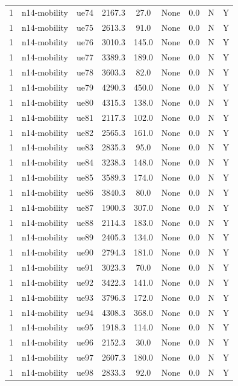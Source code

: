 \begin{table}[ht]
\begin{tabular}{|c|c|c|c|c|c|c|c|c|}
1 & n14-mobility & ue74 & 2167.3 & 27.0 & None & 0.0 & N & Y \\
1 & n14-mobility & ue75 & 2613.3 & 91.0 & None & 0.0 & N & Y \\
1 & n14-mobility & ue76 & 3010.3 & 145.0 & None & 0.0 & N & Y \\
1 & n14-mobility & ue77 & 3389.3 & 189.0 & None & 0.0 & N & Y \\
1 & n14-mobility & ue78 & 3603.3 & 82.0 & None & 0.0 & N & Y \\
1 & n14-mobility & ue79 & 4290.3 & 450.0 & None & 0.0 & N & Y \\
1 & n14-mobility & ue80 & 4315.3 & 138.0 & None & 0.0 & N & Y \\
1 & n14-mobility & ue81 & 2117.3 & 102.0 & None & 0.0 & N & Y \\
1 & n14-mobility & ue82 & 2565.3 & 161.0 & None & 0.0 & N & Y \\
1 & n14-mobility & ue83 & 2835.3 & 95.0 & None & 0.0 & N & Y \\
1 & n14-mobility & ue84 & 3238.3 & 148.0 & None & 0.0 & N & Y \\
1 & n14-mobility & ue85 & 3589.3 & 174.0 & None & 0.0 & N & Y \\
1 & n14-mobility & ue86 & 3840.3 & 80.0 & None & 0.0 & N & Y \\
1 & n14-mobility & ue87 & 1900.3 & 307.0 & None & 0.0 & N & Y \\
1 & n14-mobility & ue88 & 2114.3 & 183.0 & None & 0.0 & N & Y \\
1 & n14-mobility & ue89 & 2405.3 & 134.0 & None & 0.0 & N & Y \\
1 & n14-mobility & ue90 & 2794.3 & 181.0 & None & 0.0 & N & Y \\
1 & n14-mobility & ue91 & 3023.3 & 70.0 & None & 0.0 & N & Y \\
1 & n14-mobility & ue92 & 3422.3 & 141.0 & None & 0.0 & N & Y \\
1 & n14-mobility & ue93 & 3796.3 & 172.0 & None & 0.0 & N & Y \\
1 & n14-mobility & ue94 & 4308.3 & 368.0 & None & 0.0 & N & Y \\
1 & n14-mobility & ue95 & 1918.3 & 114.0 & None & 0.0 & N & Y \\
1 & n14-mobility & ue96 & 2152.3 & 30.0 & None & 0.0 & N & Y \\
1 & n14-mobility & ue97 & 2607.3 & 180.0 & None & 0.0 & N & Y \\
1 & n14-mobility & ue98 & 2833.3 & 92.0 & None & 0.0 & N & Y \\

\end{tabular}
\end{table}
